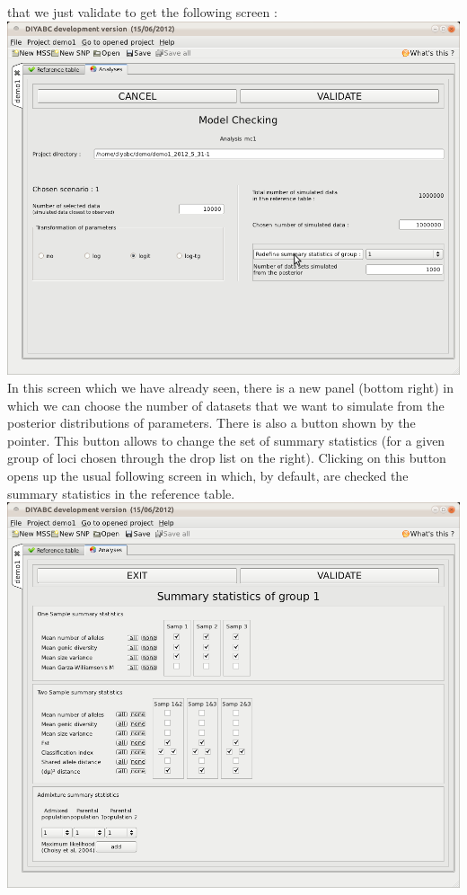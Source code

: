 that we just validate to get the following screen :\\


\includegraphics[scale=0.35]{gui_pictures/Capture-DIYABC-55} \\


In this screen which we have already seen, there is a new panel (bottom
right) in which we can choose the number of datasets that we want
to simulate from the posterior distributions of parameters. There
is also a button 
shown by the pointer. This button allows to change the set of summary
statistics (for a given group of loci chosen through the drop list
on the right). Clicking on this button opens up the usual following
screen in which, by default, are checked the summary statistics in
the reference table.\\


\includegraphics[scale=0.35]{gui_pictures/Capture-DIYABC-56} \\



